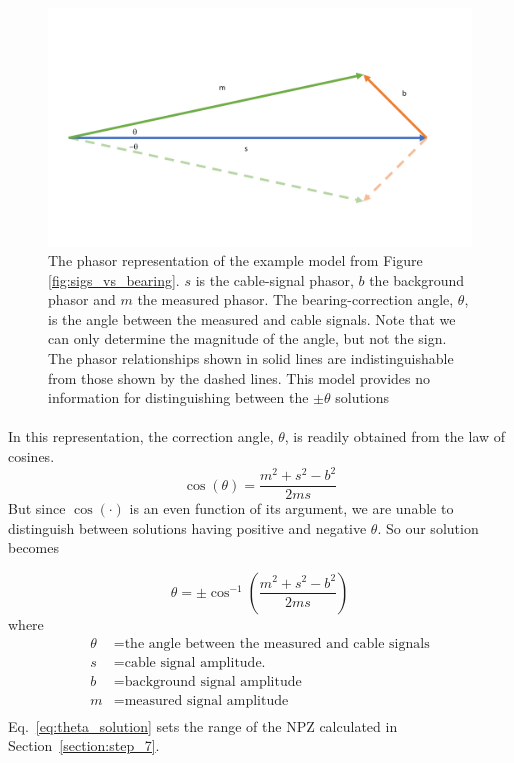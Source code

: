 \documentclass[paper=a4, fontsize=11pt]{scrartcl}
\numberwithin{equation}{section}		%
\numberwithin{figure}{section}			%
\numberwithin{table}{section}				%
\begin{document}
\begin{appendices}
\begin{figure}[h]
  \caption{
  The phasor representation of the example model from Figure \ref{fig:sigs_vs_bearing}. $s$ is the cable-signal phasor, $b$ the background phasor and $m$ the measured phasor.  The bearing-correction angle, $\theta$, is the angle between the measured and cable signals.  Note that we can only determine the magnitude of the angle, but not the sign.  The phasor relationships shown in solid lines are indistinguishable from those shown by the dashed lines.  This model provides no information for distinguishing between the $\pm\theta$ solutions}
  \label{fig:phasor_base}
  \centering
  \includegraphics[width=1.0\textwidth]{figures/phasor_base.pdf}
\end{figure}

\paragraph{}
 In this representation, the correction angle, $\theta$, is readily obtained from the law of cosines.
\begin{equation} \label{eq:law_of_cos}
    \cos\left(\theta\right) = \frac{m^2 + s^2 - b^2}{2ms}
\end{equation}
But since $\cos\left(\cdot\right)$ is an even function of its argument, we are unable to distinguish between solutions having positive and negative $\theta$.  So our solution becomes

\begin{equation} \label{eq:theta_solution}
\theta = \pm \cos^{-1}\left(\frac{m^2 + s^2 - b^2}{2ms}\right)
\end{equation}
where
\begin{align*}
        \theta &= \text{the angle between the measured and cable signals}\\
        s &= \text{cable signal amplitude.}\\
        b &= \text{background signal amplitude} \\
        m &= \text{measured signal amplitude} \\
\end{align*}
Eq.~\ref{eq:theta_solution} sets the range of the NPZ calculated in Section~\ref{section:step_7}.  



\end{appendices}
\end{document}
